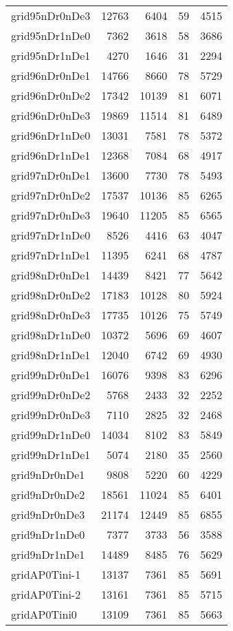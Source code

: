 \documentclass[../../../thesis.tex]{subfiles}
\begin{document}
\begin{longtable}{lrrrr}
grid95nDr0nDe3 & 12763 & 6404 & 59 & 4515 \\
grid95nDr1nDe0 & 7362 & 3618 & 58 & 3686 \\
grid95nDr1nDe1 & 4270 & 1646 & 31 & 2294 \\
grid96nDr0nDe1 & 14766 & 8660 & 78 & 5729 \\
grid96nDr0nDe2 & 17342 & 10139 & 81 & 6071 \\
grid96nDr0nDe3 & 19869 & 11514 & 81 & 6489 \\
grid96nDr1nDe0 & 13031 & 7581 & 78 & 5372 \\
grid96nDr1nDe1 & 12368 & 7084 & 68 & 4917 \\
grid97nDr0nDe1 & 13600 & 7730 & 78 & 5493 \\
grid97nDr0nDe2 & 17537 & 10136 & 85 & 6265 \\
grid97nDr0nDe3 & 19640 & 11205 & 85 & 6565 \\
grid97nDr1nDe0 & 8526 & 4416 & 63 & 4047 \\
grid97nDr1nDe1 & 11395 & 6241 & 68 & 4787 \\
grid98nDr0nDe1 & 14439 & 8421 & 77 & 5642 \\
grid98nDr0nDe2 & 17183 & 10128 & 80 & 5924 \\
grid98nDr0nDe3 & 17735 & 10126 & 75 & 5749 \\
grid98nDr1nDe0 & 10372 & 5696 & 69 & 4607 \\
grid98nDr1nDe1 & 12040 & 6742 & 69 & 4930 \\
grid99nDr0nDe1 & 16076 & 9398 & 83 & 6296 \\
grid99nDr0nDe2 & 5768 & 2433 & 32 & 2252 \\
grid99nDr0nDe3 & 7110 & 2825 & 32 & 2468 \\
grid99nDr1nDe0 & 14034 & 8102 & 83 & 5849 \\
grid99nDr1nDe1 & 5074 & 2180 & 35 & 2560 \\
grid9nDr0nDe1 & 9808 & 5220 & 60 & 4229 \\
grid9nDr0nDe2 & 18561 & 11024 & 85 & 6401 \\
grid9nDr0nDe3 & 21174 & 12449 & 85 & 6855 \\
grid9nDr1nDe0 & 7377 & 3733 & 56 & 3588 \\
grid9nDr1nDe1 & 14489 & 8485 & 76 & 5629 \\
gridAP0Tini-1 & 13137 & 7361 & 85 & 5691 \\
gridAP0Tini-2 & 13161 & 7361 & 85 & 5715 \\
gridAP0Tini0 & 13109 & 7361 & 85 & 5663 \\

\end{longtable}
\end{document}

